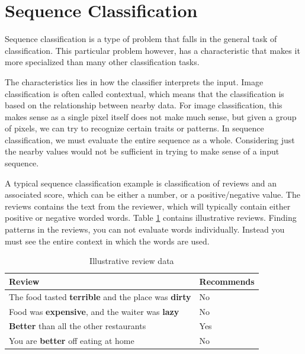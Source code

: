 
\section{Sequence Classification}
Sequence classification is a type of problem that falls in the general task of classification. This particular problem however, has a characteristic that makes it more specialized than many other classification tasks.

The characteristics lies in how the classifier interprets the input. Image classification is often called contextual, which means that the classification is based on the relationship between nearby data. For image classification, this makes sense as a single pixel itself does not make much sense, but given a group of pixels, we can try to recognize certain traits or patterns. In sequence classification, we must evaluate the entire sequence as a whole. Considering just the nearby values would not be sufficient in trying to make sense of a input sequence. 

A typical sequence classification example is classification of reviews and an associated score, which can be either a number, or a positive/negative value. The reviews contains the text from the reviewer, which will typically contain either positive or negative worded words. Table \ref{table:sequence-classification-illustration} contains illustrative reviews. Finding patterns in the reviews, you can not evaluate words individually. Instead you must see the entire context in which the words are used.

\begin{table}[ht]
    \centering
    \begin{tabular}{|l|l|}
        \hline 
        \textbf{Review}                                                    & \textbf{Recommends} \\ \hline
        The food tasted \textbf{terrible} and the place was \textbf{dirty} & No                  \\ \hline
        Food was \textbf{expensive}, and the waiter was \textbf{lazy}      & No                  \\ \hline
        \textbf{Better} than all the other restaurants                     & Yes                 \\ \hline
        You are \textbf{better} off eating at home                         & No                  \\ \hline
    \end{tabular}
    \label{table:sequence-classification-illustration}
    \caption{Illustrative review data}
\end{table}

